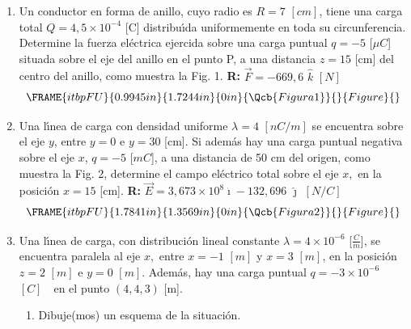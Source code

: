 \documentclass[12pt]{article}
\begin{document}
\begin{enumerate}
\item Un conductor en forma de anillo, cuyo radio es $R=7$ $[cm]$, tiene una
carga total $Q=4,5\times 10^{-4}$ [C] distribu\'{\i}da uniformemente en toda
su circunferencia. Determine la fuerza el\'{e}ctrica ejercida sobre una
carga puntual $q=-5$ [$\mu C$] situada sobre el eje del anillo en el punto
P, a una distancia $z=15$ [cm] del centro del anillo, como muestra la Fig.
1. \textbf{R: }$\vec{F}=-669,6$ $\hat{k}$ $[N]$%
\begin{equation*}
\FRAME{itbpFU}{0.9945in}{1.7244in}{0in}{\Qcb{Figura 1}}{}{Figure}{\special%
{language "Scientific Word";type "GRAPHIC";maintain-aspect-ratio
TRUE;display "USEDEF";valid_file "T";width 0.9945in;height 1.7244in;depth
0in;original-width 1.5627in;original-height 2.7294in;cropleft "0";croptop
"1";cropright "1";cropbottom "0";tempfilename
'R03JBW01.wmf';tempfile-properties "XPR";}}
\end{equation*}

\item Una l\'{\i}nea de carga con densidad uniforme $\lambda =4$ $[nC/m]$ se
encuentra sobre el eje $y$, entre $y=0$ e $y=30$ [cm]. Si adem\'{a}s hay una
carga puntual negativa sobre el eje $x$, $q=-5$ [$mC$], a una distancia de
50 cm del origen, como muestra la Fig. 2, determine el campo el\'{e}ctrico
total sobre el eje $x,$ en la posici\'{o}n $x=15$ [cm]. \textbf{R: }$\vec{E}%
=3,673\times 10^{8}\hat{\imath}-132,696$ $\hat{\jmath}$ $[N/C]$ 
\begin{equation*}
\FRAME{itbpFU}{1.7841in}{1.3569in}{0in}{\Qcb{Figura 2}}{}{Figure}{\special%
{language "Scientific Word";type "GRAPHIC";maintain-aspect-ratio
TRUE;display "USEDEF";valid_file "T";width 1.7841in;height 1.3569in;depth
0in;original-width 6.9272in;original-height 5.2641in;cropleft "0";croptop
"1";cropright "1";cropbottom "0";tempfilename
'R03JBW02.wmf';tempfile-properties "XPR";}}
\end{equation*}

\item Una l\'{\i}nea de carga, con distribuci\'{o}n lineal constante $%
\lambda =4\times 10^{-6}$ [$\frac{C}{m}$], se encuentra paralela al eje $x,$
entre \thinspace $x=-1$ $[m]$ y $x=3$ $[m]$, en la posici\'{o}n $z=2$ $[m]$
e $y=0$ $[m]$. Adem\'{a}s, hay una carga puntual $q=-3\times 10^{-6}$ $[C]\,$%
\ en el punto $(4,4,3)$ [m].

\begin{enumerate}
\item Dibuje(mos) un esquema de la situaci\'{o}n.


\end{enumerate}
\end{enumerate}
\end{document}
